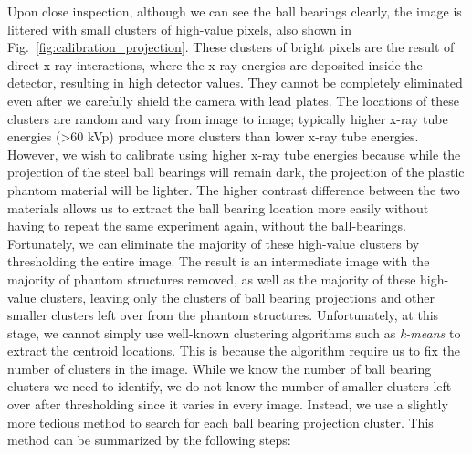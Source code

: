 Upon close inspection, although we can see the ball bearings clearly, the image is littered with small clusters of high-value pixels, also shown in Fig.~\ref{fig:calibration_projection}.  These clusters of bright pixels are the result of direct x-ray interactions, where the x-ray energies are deposited inside the detector, resulting in high detector values.  They cannot be completely eliminated even after we carefully shield the camera with lead plates.  The locations of these clusters are random and vary from image to image; typically higher x-ray tube energies (>60 kVp) produce more clusters than lower x-ray tube energies.  However, we wish to calibrate using higher x-ray tube energies because while the projection of the steel ball bearings will remain dark, the projection of the plastic phantom material will be lighter.  The higher contrast difference between the two materials allows us to extract the ball bearing location more easily without having to repeat the same experiment again, without the ball-bearings.  Fortunately, we can eliminate the majority of these high-value clusters by thresholding the entire image.  The result is an intermediate image with the majority of phantom structures removed, as well as the majority of these high-value clusters, leaving only the clusters of ball bearing projections and other smaller clusters left over from the phantom structures.  Unfortunately, at this stage, we cannot simply use well-known clustering algorithms such as \textit{k-means} to extract the centroid locations.  This is because the algorithm require us to fix the number of clusters in the image.  While we know the number of ball bearing clusters we need to identify, we do not know the number of smaller clusters left over after thresholding since it varies in every image.  Instead, we use a slightly more tedious method to search for each ball bearing projection cluster.  This method can be summarized by the following steps:
%

